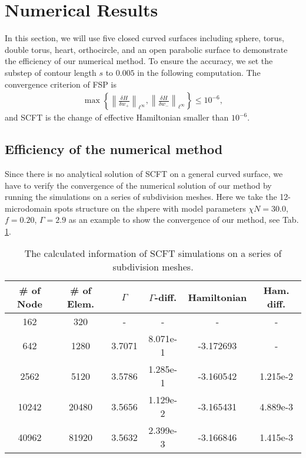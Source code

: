 \documentclass[final,1p,times]{elsarticle}
\begin{document}
\section{Numerical Results}
\label{sec:rslt}

In this section, we will use five closed curved surfaces including sphere,
torus, double torus, heart, orthocircle, and an open parabolic surface to
demonstrate the efficiency of our numerical method.  To ensure the accuracy, we
set the substep of contour length $s$ to $0.005$ in the following computation.
The convergence criterion of FSP is 
\begin{align}
	\max\left\{
	\left\|\frac{\delta H}{\delta w_+} \right\|_{\ell^\infty},
	\left\|\frac{\delta H}{\delta w_-} \right\|_{\ell^\infty} 
	\right\} \leq 10^{-6},
	\label{}
\end{align}
and SCFT is the change of effective Hamiltonian smaller than $10^{-6}$.

\subsection{Efficiency of the numerical method}

Since there is no analytical solution of SCFT on a general curved surface, we
have to verify the convergence of the numerical solution of our method by
running the simulations on a series of subdivision meshes. Here we take the
12-microdomain spots structure on the shpere with model parameters $\chi
N=30.0$, $f=0.20$, $\Gamma=2.9$ as an example to show the convergence of our
method,  see Tab.\,\ref{tab:refinemesh}. 

\begin{table}[H]
\caption{
The calculated information of SCFT simulations on a series of subdivision meshes.}
  \label{tab:refinemesh}
  \centering
\begin{tabular}{|c|c|c|c|c|c|}
 \hline
 \# of Node  & \# of Elem. & $\Gamma$ & $\Gamma$-diff. & Hamiltonian &
 Ham. diff. \\
 \hline
162  & 320   & -  & - & -&  -  \\ 
 \hline
 642   & 1280  & 3.7071  & 8.071e-1 & -3.172693  & - \\
 \hline
2562  & 5120  & 3.5786  & 1.285e-1 & -3.160542 &  1.215e-2\\
 \hline
10242 & 20480 & 3.5656  & 1.129e-2 & -3.165431 & 4.889e-3\\
 \hline
40962 & 81920 & 3.5632  & 2.399e-3 & -3.166846 & 1.415e-3 \\
 \hline
\end{tabular}
\end{table}
\end{document}
